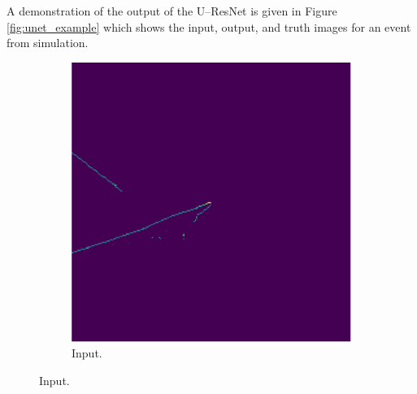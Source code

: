 A demonstration of the output of the U--ResNet is given in Figure 
\ref{fig:unet_example} which shows the input, output, and truth images for an 
event from \protodune{} simulation.
\begin{figure}
	\centering

	\begin{subfigure}[b]{0.5\textwidth}
		\centering
		\includegraphics[width=\textwidth]{figures/unet_example_in.pdf}
		\caption {Input.}
		\label{fig:unet_example_in}
	\end{subfigure}


\end{figure}
